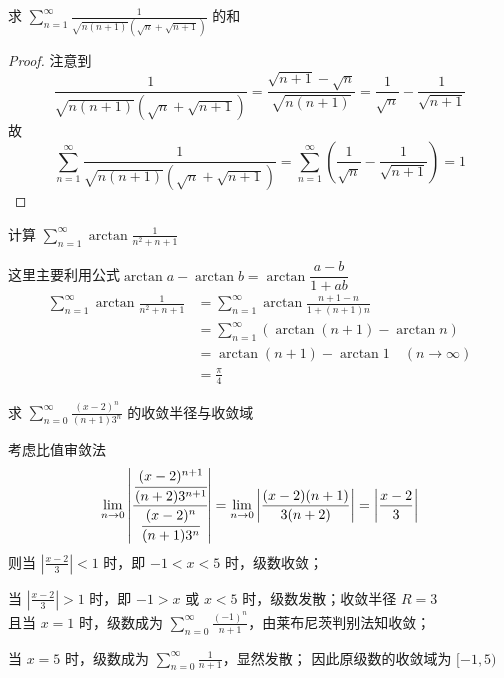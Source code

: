 \documentclass[color=green,titlestyle=hang]{elegantbook}%
\begin{document}
\begin{example}
求 $\sum_{n=1}^{\infty}\frac{1}{\sqrt{n(n+1)}(\sqrt{n}+\sqrt{n+1})}$ 的和	
\end{example}\begin{proof}
注意到
\[\frac{1}{\sqrt{n(n+1)} (\sqrt{n} + \sqrt{n+1})} = \frac{\sqrt{n+1} -\sqrt{n}}{\sqrt{n(n+1)}} = \frac1{\sqrt{n}} - \frac1{\sqrt{n+1}}\]
故\[\sum_{n=1}^{\infty}\frac{1}{\sqrt{n(n+1)} (\sqrt{n} + \sqrt{n+1})} 
=  \sum_{n=1}^{\infty}\left(\frac1{\sqrt{n}} - \frac1{\sqrt{n+1}}\right)=1\]
\end{proof}

\begin{example}
计算 $\displaystyle \sum_{n=1}^\infty \arctan\frac{1}{n^2+n+1}$	
\end{example}\begin{solution}
这里主要利用公式$\arctan a-\arctan b=\arctan\dfrac{a-b}{1+ab}$
\begin{align*}
\sum_{n=1}^\infty \arctan\frac{1}{n^2+n+1}&=\sum_{n=1}^\infty \arctan\frac{n+1-n}{1+(n+1)n}\\
&=\sum_{n=1}^\infty (\arctan(n+1)-\arctan n)\\
&=\arctan(n+1)-\arctan 1\quad(n\to \infty)\\
&=\frac{\pi}{4}
\end{align*}	
\end{solution}

\begin{example}
求 $\sum_{n=0}^{\infty}\frac{(x-2)^n}{(n+1)3^n}$ 的收敛半径与收敛域	
\end{example}\begin{Solution}考虑比值审敛法
\[\lim_{n\to0}\left|\cfrac{\cfrac{(x-2)^{n+1}}{(n+2)3^{n+1}}}{\cfrac{(x-2)^n}{(n+1)3^n}}\right|=\lim_{n\to0}\left|\frac{(x-2)(n+1)}{3(n+2)}\right|=\left|\frac{x-2}{3}\right|\]
则当 $\left|\frac{x-2}{3}\right|<1$ 时，即 $-1<x<5$ 时，级数收敛；\\
\par\setlength{\parindent}{1em}当 $\left|\frac{x-2}{3}\right|>1$ 时，即 $-1>x$ 或 $x<5$ 时，级数发散；{\color{red}收敛半径 $R=3$}\\
且当  $x=1$ 时，级数成为 $\sum_{n=0}^{\infty}\frac{(-1)^n}{n+1}$，由莱布尼茨判别法知收敛；\\
\par 当  $x=5$ 时，级数成为 $\sum_{n=0}^{\infty}\frac{1}{n+1}$，显然发散；
因此原级数的{\color{red}收敛域为 $[-1,5)$}	
\end{Solution}
\end{document}
